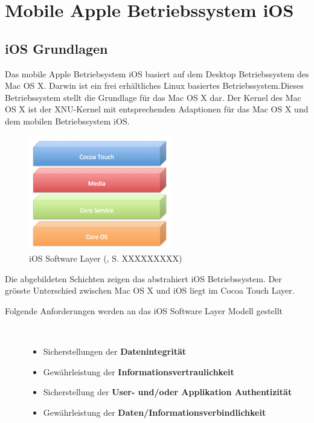 %
%
% 
% 
% 
\chapter{Mobile Apple Betriebssystem iOS}
\label{ch:iOS}
\section{iOS Grundlagen}
\label{sec:iOSGrundlage}

Das mobile Apple Betriebsystem iOS basiert auf dem Desktop Betriebssystem des Mac OS X. Darwin ist ein frei erhältliches Linux basiertes Betriebssystem.Dieses Betriebssystem stellt die Grundlage für das Mac OS X dar. Der Kernel des Mac OS X ist der XNU-Kernel mit entsprechenden Adaptionen für das Mac OS X und dem mobilen Betriebssystem iOS.
\begin{figure}[htbp]
        \centering
                \includegraphics[height=5cm]{Bilder/Chapter3_SystemArchitektur}
        \caption{iOS Software Layer (\cite{Apple[6]}, S. XXXXXXXXX)}
        	\label{fig:iOS Software Layer}
\end{figure}
Die abgebildeten Schichten zeigen das abstrahiert iOS Betriebssystem. Der grösste Unterschied zwischen Mac OS X und iOS liegt im Cocoa Touch Layer.
  
\begin{description}
\item[Folgende \glqq Anforderungen\grqq{} werden an das iOS Software Layer Modell gestellt]~\par
	\begin{itemize}
		\item Sicherstellungen der \textbf{Datenintegrität}
		\item Gewährleistung der \textbf{Informationsvertraulichkeit}
		\item Sicherstellung der \textbf{User- und/oder Applikation Authentizität}
		\item Gewährleistung der \textbf{Daten/Informationsverbindlichkeit}
	\end{itemize}
\end{description}

